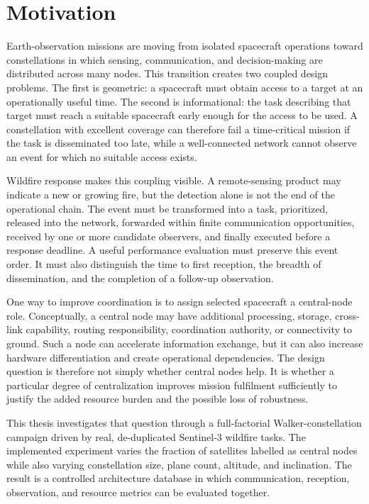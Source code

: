 \section{Motivation}

Earth-observation missions are moving from isolated spacecraft operations toward constellations in which sensing, communication, and decision-making are distributed across many nodes. This transition creates two coupled design problems. The first is geometric: a spacecraft must obtain access to a target at an operationally useful time. The second is informational: the task describing that target must reach a suitable spacecraft early enough for the access to be used. A constellation with excellent coverage can therefore fail a time-critical mission if the task is disseminated too late, while a well-connected network cannot observe an event for which no suitable access exists.

Wildfire response makes this coupling visible. A remote-sensing product may indicate a new or growing fire, but the detection alone is not the end of the operational chain. The event must be transformed into a task, prioritized, released into the network, forwarded within finite communication opportunities, received by one or more candidate observers, and finally executed before a response deadline. A useful performance evaluation must preserve this event order. It must also distinguish the time to first reception, the breadth of dissemination, and the completion of a follow-up observation.

One way to improve coordination is to assign selected spacecraft a central-node role. Conceptually, a central node may have additional processing, storage, cross-link capability, routing responsibility, coordination authority, or connectivity to ground. Such a node can accelerate information exchange, but it can also increase hardware differentiation and create operational dependencies. The design question is therefore not simply whether central nodes help. It is whether a particular degree of centralization improves mission fulfilment sufficiently to justify the added resource burden and the possible loss of robustness.

This thesis investigates that question through a full-factorial Walker-constellation campaign driven by real, de-duplicated Sentinel-3 wildfire tasks. The implemented experiment varies the fraction of satellites labelled as central nodes while also varying constellation size, plane count, altitude, and inclination. The result is a controlled architecture database in which communication, reception, observation, and resource metrics can be evaluated together.

